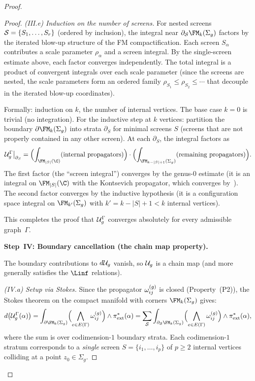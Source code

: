 \begin{proof}
\begin{proof}
\medskip\noindent
\emph{(III.e) Induction on the number of screens.}
For nested screens $\mathcal{S} = \{S_1, \ldots, S_r\}$
(ordered by inclusion), the integral near
$\partial_{\cS}\FMg{k}$ factors by the iterated blow-up
structure of the FM compactification. Each screen $S_\alpha$
contributes a scale parameter $\rho_\alpha$ and a
screen integral. By the single-screen estimate above,
each factor converges independently. The total integral is a
product of convergent integrals over each scale parameter
(since the screens are nested, the scale parameters form an
ordered family $\rho_{S_1} \le \rho_{S_2} \le \cdots$ that
decouple in the iterated blow-up coordinates).

Formally: induction on $k$, the number of
internal vertices. The base case $k = 0$ is trivial (no
integration). For the inductive step at $k$ vertices:
partition the boundary $\partial\FMg{k}$ into strata
$\partial_S$ for minimal screens $S$ (screens that are not
properly contained in any other screen). At each
$\partial_S$, the integral factors as
\[
 \cU_g^{\Gamma}\big|_{\partial_S}
 = \Bigl(\int_{\FM_{|S|}(\C)} (\text{internal propagators})
 \Bigr)
 \cdot
 \Bigl(\int_{\FMg{k - |S| + 1}}
 (\text{remaining propagators})\Bigr).
\]
The first factor (the ``screen integral'') converges by the
genus-$0$ estimate (it is an integral on $\FM_{|S|}(\C)$ with
the Kontsevich propagator, which converges by~\cite{Kon03}).
The second factor converges by the inductive hypothesis
(it is a configuration space integral on $\FMg{k'}$ with
$k' = k - |S| + 1 < k$ internal vertices).

This completes the proof that $\mathcal{U}_g^\Gamma$ converges
absolutely for every admissible graph~$\Gamma$.

\bigskip\noindent
\textbf{Step~IV: Boundary cancellation (the chain map property).}

The boundary contributions to $d \mathcal{U}_g$ vanish, so
$\mathcal{U}_g$ is a chain map (and more generally satisfies the
$\Linf$ relations).

\medskip\noindent
\emph{(IV.a) Setup via Stokes.}
Since the propagator $\omega^{(g)}_{ij}$ is closed
(Property~(P2)), the Stokes theorem on the compact manifold
with corners $\FMg{k}$ gives:
\begin{equation}\label{eq:stokes-genus-g}
 d\bigl(\cU_g^{\Gamma}(\alpha)\bigr)
 = \int_{\partial\FMg{k}}
 \Bigl(\bigwedge_{e \in E(\Gamma)} \omhol_{ij}\Bigr)
 \wedge \pi_{\mathrm{ext}}^\ast(\alpha)
 = \sum_{\cS} \int_{\partial_{\cS}\FMg{k}}
 \Bigl(\bigwedge_{e \in E(\Gamma)} \omhol_{ij}\Bigr)
 \wedge \pi_{\mathrm{ext}}^\ast(\alpha),
\end{equation}
where the sum is over codimension-$1$ boundary strata.
Each codimension-$1$ stratum corresponds to a \emph{single}
screen $S = \{i_1, \ldots, i_p\}$ of $p \ge 2$ internal
vertices colliding at a point $z_0 \in \Sigma_g$.


\end{proof}
\end{proof}
